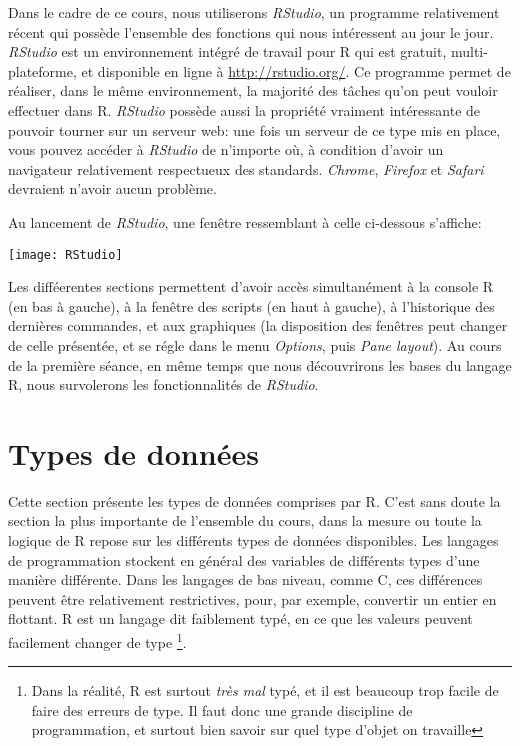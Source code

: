 Dans le cadre de ce cours, nous utiliserons \emph{RStudio}, un programme relativement récent qui possède l'ensemble des fonctions qui nous intéressent au jour le jour. \emph{RStudio} est un environnement intégré de travail pour R qui est gratuit, multi-plateforme, et disponible en ligne à \url{http://rstudio.org/}. Ce programme permet de réaliser, dans le même environnement, la majorité des tâches qu'on peut vouloir effectuer dans R. \emph{RStudio} possède aussi la propriété vraiment intéressante de pouvoir tourner sur un serveur web: une fois un serveur de ce type mis en place, vous pouvez accéder à \emph{RStudio} de n'importe où, à condition d'avoir un navigateur relativement respectueux des standards. \emph{Chrome}, \emph{Firefox} et \emph{Safari} devraient n'avoir aucun problème. 

Au lancement de \emph{RStudio}, une fenêtre ressemblant à celle ci-dessous s'affiche:

\begin{center}
\texttt{[image: RStudio]}
\end{center}

Les difféerentes sections permettent d'avoir accès simultanément à la console R (en bas à gauche), à la fenêtre des scripts (en haut à gauche), à l'historique des dernières commandes, et aux graphiques (la disposition des fenêtres peut changer de celle présentée, et se régle dans le menu \emph{Options}, puis \emph{Pane layout}). Au cours de la première séance, en même temps que nous découvrirons les bases du langage R, nous survolerons les fonctionnalités de \emph{RStudio}.

\section{Types de données}

Cette section présente les types de données comprises par R. C'est sans doute la section la plus importante de l'ensemble du cours, dans la mesure ou toute la logique de R repose sur les différents types de données disponibles. Les langages de programmation stockent en général des variables de différents types d'une manière différente. Dans les langages de bas niveau, comme C, ces différences peuvent être relativement restrictives, pour, par exemple, convertir un entier en flottant. R est un langage dit faiblement typé, en ce que les valeurs peuvent facilement changer de type \footnote{Dans la réalité, R est surtout \emph{très mal} typé, et il est beaucoup trop facile de faire des erreurs de type. Il faut donc une grande discipline de programmation, et surtout bien savoir sur quel type d'objet on travaille}.


